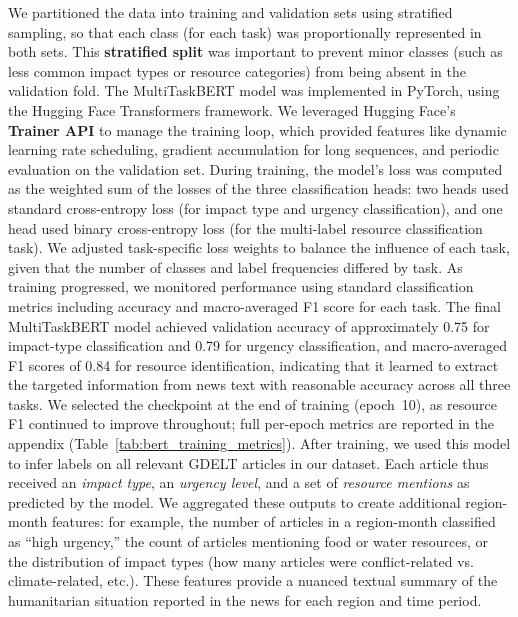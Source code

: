 \documentclass{article}
\begin{document}
We partitioned the data into training and validation sets using stratified sampling, so that each class (for each task) was proportionally represented in both sets. This \textbf{stratified split} was important to prevent minor classes (such as less common impact types or resource categories) from being absent in the validation fold. The MultiTaskBERT model was implemented in PyTorch, using the Hugging Face Transformers framework. We leveraged Hugging Face’s \textbf{Trainer API} to manage the training loop, which provided features like dynamic learning rate scheduling, gradient accumulation for long sequences, and periodic evaluation on the validation set. During training, the model’s loss was computed as the weighted sum of the losses of the three classification heads: two heads used standard cross-entropy loss (for impact type and urgency classification), and one head used binary cross-entropy loss (for the multi-label resource classification task). We adjusted task-specific loss weights to balance the influence of each task, given that the number of classes and label frequencies differed by task. As training progressed, we monitored performance using standard classification metrics including accuracy and macro-averaged F1 score for each task. The final MultiTaskBERT model achieved validation accuracy of approximately 0.75 for impact-type classification and 0.79 for urgency classification, and macro-averaged F1 scores of 0.84 for resource identification, indicating that it learned to extract the targeted information from news text with reasonable accuracy across all three tasks. We selected the checkpoint at the end of training (epoch~10), as resource F1 continued to improve throughout; full per-epoch metrics are reported in the appendix (Table~\ref{tab:bert_training_metrics}). After training, we used this model to infer labels on all relevant GDELT articles in our dataset. Each article thus received an \textit{impact type}, an \textit{urgency level}, and a set of \textit{resource mentions} as predicted by the model. We aggregated these outputs to create additional region-month features: for example, the number of articles in a region-month classified as “high urgency,” the count of articles mentioning food or water resources, or the distribution of impact types (how many articles were conflict-related vs. climate-related, etc.). These features provide a nuanced textual summary of the humanitarian situation reported in the news for each region and time period. \\
\end{document}
